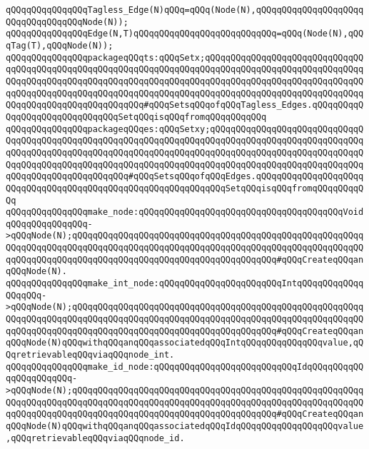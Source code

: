 \verb|qQQqqQQqqQQqqQQqTagless_Edge(N)qQQq=qQQq(Node(N),qQQqqQQqqQQqqQQqqQQqqQQqqQQqqQQqqQQqNode(N));|\newline
\verb|qQQqqQQqqQQqqQQqEdge(N,T)qQQqqQQqqQQqqQQqqQQqqQQqqQQq=qQQq(Node(N),qQQqTag(T),qQQqNode(N));|\newline
\newline
\verb|qQQqqQQqqQQqqQQqpackageqQQqts:qQQqSetx;qQQqqQQqqQQqqQQqqQQqqQQqqQQqqQQqqQQqqQQqqQQqqQQqqQQqqQQqqQQqqQQqqQQqqQQqqQQqqQQqqQQqqQQqqQQqqQQqqQQqqQQqqQQqqQQqqQQqqQQqqQQqqQQqqQQqqQQqqQQqqQQqqQQqqQQqqQQqqQQqqQQqqQQqqQQqqQQqqQQqqQQqqQQqqQQqqQQqqQQqqQQqqQQqqQQqqQQqqQQqqQQqqQQqqQQqqQQqqQQqqQQqqQQqqQQqqQQqqQQqqQQqqQQq#qQQqSetsqQQqofqQQqTagless_Edges.qQQqqQQqqQQqqQQqqQQqqQQqqQQqqQQqSetqQQqisqQQqfromqQQqqQQqqQQq|\newline
\verb|qQQqqQQqqQQqqQQqpackageqQQqes:qQQqSetxy;qQQqqQQqqQQqqQQqqQQqqQQqqQQqqQQqqQQqqQQqqQQqqQQqqQQqqQQqqQQqqQQqqQQqqQQqqQQqqQQqqQQqqQQqqQQqqQQqqQQqqQQqqQQqqQQqqQQqqQQqqQQqqQQqqQQqqQQqqQQqqQQqqQQqqQQqqQQqqQQqqQQqqQQqqQQqqQQqqQQqqQQqqQQqqQQqqQQqqQQqqQQqqQQqqQQqqQQqqQQqqQQqqQQqqQQqqQQqqQQqqQQqqQQqqQQqqQQqqQQqqQQq#qQQqSetsqQQqofqQQqEdges.qQQqqQQqqQQqqQQqqQQqqQQqqQQqqQQqqQQqqQQqqQQqqQQqqQQqqQQqqQQqqQQqSetqQQqisqQQqfromqQQqqQQqqQQq|\newline
\newline
\verb|qQQqqQQqqQQqqQQqmake_node:qQQqqQQqqQQqqQQqqQQqqQQqqQQqqQQqqQQqqQQqVoidqQQqqQQqqQQqqQQq->qQQqNode(N);qQQqqQQqqQQqqQQqqQQqqQQqqQQqqQQqqQQqqQQqqQQqqQQqqQQqqQQqqQQqqQQqqQQqqQQqqQQqqQQqqQQqqQQqqQQqqQQqqQQqqQQqqQQqqQQqqQQqqQQqqQQqqQQqqQQqqQQqqQQqqQQqqQQqqQQqqQQqqQQqqQQqqQQqqQQqqQQqqQQq#qQQqCreateqQQqanqQQqNode(N).|\newline
\verb|qQQqqQQqqQQqqQQqmake_int_node:qQQqqQQqqQQqqQQqqQQqqQQqIntqQQqqQQqqQQqqQQqqQQq->qQQqNode(N);qQQqqQQqqQQqqQQqqQQqqQQqqQQqqQQqqQQqqQQqqQQqqQQqqQQqqQQqqQQqqQQqqQQqqQQqqQQqqQQqqQQqqQQqqQQqqQQqqQQqqQQqqQQqqQQqqQQqqQQqqQQqqQQqqQQqqQQqqQQqqQQqqQQqqQQqqQQqqQQqqQQqqQQqqQQqqQQqqQQq#qQQqCreateqQQqanqQQqNode(N)qQQqwithqQQqanqQQqassociatedqQQqIntqQQqqQQqqQQqqQQqvalue,qQQqretrievableqQQqviaqQQqnode_int.|\newline
\verb|qQQqqQQqqQQqqQQqmake_id_node:qQQqqQQqqQQqqQQqqQQqqQQqqQQqIdqQQqqQQqqQQqqQQqqQQqqQQq->qQQqNode(N);qQQqqQQqqQQqqQQqqQQqqQQqqQQqqQQqqQQqqQQqqQQqqQQqqQQqqQQqqQQqqQQqqQQqqQQqqQQqqQQqqQQqqQQqqQQqqQQqqQQqqQQqqQQqqQQqqQQqqQQqqQQqqQQqqQQqqQQqqQQqqQQqqQQqqQQqqQQqqQQqqQQqqQQqqQQqqQQqqQQq#qQQqCreateqQQqanqQQqNode(N)qQQqwithqQQqanqQQqassociatedqQQqIdqQQqqQQqqQQqqQQqqQQqvalue,qQQqretrievableqQQqviaqQQqnode_id.|\newline
